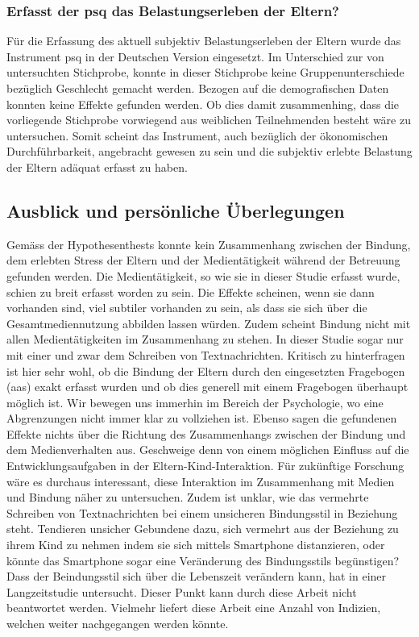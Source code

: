 \subsubsection{Erfasst der \acrshort{psq} das Belastungserleben der Eltern?}
Für die Erfassung des aktuell subjektiv Belastungserleben der Eltern wurde das Instrument \acrfull{psq} in der Deutschen Version eingesetzt. Im Unterschied zur von  untersuchten Stichprobe, konnte in dieser Stichprobe keine Gruppenunterschiede bezüglich Geschlecht gemacht werden. Bezogen auf die demografischen Daten konnten keine Effekte gefunden werden. Ob dies damit zusammenhing, dass die vorliegende Stichprobe vorwiegend aus weiblichen Teilnehmenden besteht wäre zu untersuchen. Somit scheint das Instrument, auch bezüglich der ökonomischen Durchführbarkeit, angebracht gewesen zu sein und die subjektiv erlebte Belastung der Eltern adäquat erfasst zu haben.
   

\subsection{Ausblick und persönliche Überlegungen} \label{sec:Ausblick}
Gemäss der Hypothesenthests konnte kein Zusammenhang zwischen der Bindung, dem erlebten Stress der Eltern und der Medientätigkeit während der Betreuung gefunden werden. Die Medientätigkeit, so wie sie in dieser Studie erfasst wurde, schien zu breit erfasst worden zu sein. Die Effekte scheinen, wenn sie dann vorhanden sind, viel subtiler vorhanden zu sein, als dass sie sich über die Gesamtmediennutzung abbilden lassen würden. Zudem scheint Bindung nicht mit allen Medientätigkeiten im Zusammenhang zu stehen. In dieser Studie sogar nur mit einer und zwar dem Schreiben von Textnachrichten. Kritisch zu hinterfragen ist hier sehr wohl, ob die Bindung der Eltern durch den eingesetzten Fragebogen (\acrshort{aas}) exakt erfasst wurden und ob dies generell mit einem Fragebogen überhaupt möglich ist. Wir bewegen uns immerhin im Bereich der Psychologie, wo eine Abgrenzungen nicht immer klar zu vollziehen ist. Ebenso sagen die gefundenen Effekte nichts über die Richtung des Zusammenhangs zwischen der Bindung und dem Medienverhalten aus. Geschweige denn von einem möglichen Einfluss auf die Entwicklungsaufgaben in der Eltern-Kind-Interaktion. Für zukünftige Forschung wäre es durchaus interessant, diese Interaktion im Zusammenhang mit Medien und Bindung näher zu untersuchen. Zudem ist unklar, wie das vermehrte Schreiben von Textnachrichten bei einem unsicheren Bindungsstil in Beziehung steht. Tendieren unsicher Gebundene dazu, sich vermehrt aus der Beziehung zu ihrem Kind zu nehmen indem sie sich mittels Smartphone distanzieren, oder könnte das Smartphone sogar eine Veränderung des Bindungsstils begünstigen? Dass der Beindungsstil sich über die Lebenszeit verändern kann, hat  in einer Langzeitstudie untersucht. Dieser Punkt kann durch diese Arbeit nicht beantwortet werden. Vielmehr liefert diese Arbeit eine Anzahl von Indizien, welchen weiter nachgegangen werden könnte.

